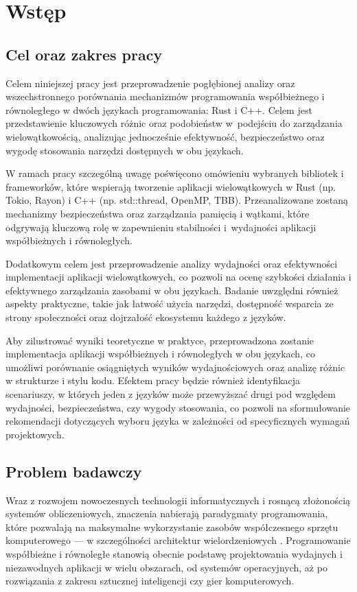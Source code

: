 \chapter[Wstęp]{Wstęp}
\section{Cel oraz zakres pracy}
Celem niniejszej pracy jest przeprowadzenie pogłębionej analizy oraz wszechstronnego porównania mechanizmów programowania współbieżnego i równoległego w dwóch językach programowania: Rust i C++. Celem jest przedstawienie kluczowych różnic oraz podobieństw w~podejściu do zarządzania wielowątkowością, analizując jednocześnie efektywność, bezpieczeństwo oraz wygodę stosowania narzędzi dostępnych w obu językach.

W ramach pracy szczególną uwagę poświęcono omówieniu wybranych bibliotek i frameworków, które wspierają tworzenie aplikacji wielowątkowych w Rust (np. Tokio, Rayon) i C++ (np. std::thread, OpenMP, TBB). Przeanalizowane zostaną mechanizmy bezpieczeństwa oraz zarządzania pamięcią i wątkami, które odgrywają kluczową rolę w zapewnieniu stabilności i~wydajności aplikacji współbieżnych i równoległych.

Dodatkowym celem jest przeprowadzenie analizy wydajności oraz efektywności implementacji aplikacji wielowątkowych, co pozwoli na ocenę szybkości działania i efektywnego zarządzania zasobami w obu językach. Badanie uwzględni również aspekty praktyczne, takie jak łatwość użycia narzędzi, dostępność wsparcia ze strony społeczności oraz dojrzałość ekosystemu każdego z języków.

Aby zilustrować wyniki teoretyczne w praktyce, przeprowadzona zostanie implementacja aplikacji współbieżnych i równoległych w obu językach, co umożliwi porównanie osiągniętych wyników wydajnościowych oraz analizę różnic w strukturze i stylu kodu. Efektem pracy będzie również identyfikacja scenariuszy, w których jeden z języków może przewyższać drugi pod względem wydajności, bezpieczeństwa, czy wygody stosowania, co pozwoli na sformułowanie rekomendacji dotyczących wyboru języka w zależności od specyficznych wymagań projektowych.
\section{Problem badawczy}
Wraz z rozwojem nowoczesnych technologii informatycznych i rosnącą złożonością systemów obliczeniowych, znaczenia nabierają paradygmaty programowania, które pozwalają na maksymalne wykorzystanie zasobów współczesnego sprzętu komputerowego — w szczególności architektur wielordzeniowych \cite{10876950,Sesay2024Parallelism}. Programowanie współbieżne i równoległe stanowią obecnie podstawę projektowania wydajnych i niezawodnych aplikacji w wielu obszarach, od systemów operacyjnych, aż po rozwiązania z zakresu sztucznej inteligencji czy gier komputerowych.

